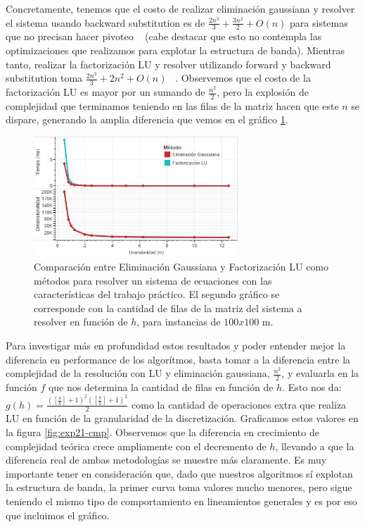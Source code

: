 Concretamente, tenemos que el costo de realizar eliminación gaussiana y resolver el sistema usando backward substitution es de $\frac{2n^3}{3} + \frac{3n^2}{2} + O(n)$ para sistemas que no precisan hacer pivoteo ~\cite{burden} (cabe destacar que esto no contempla las optimizaciones que realizamos para explotar la estructura de banda). Mientras tanto, realizar la factorización LU y resolver utilizando forward y backward substitution toma $\frac{2n^3}{3} + 2n^2 + O(n)$ ~\cite{LUComplexity}. Observemos que el costo de la factorización LU es mayor por un sumando de $\frac{n^2}{2}$, pero la explosión de complejidad que terminamos teniendo en las filas de la matriz hacen que este $n$ se dispare, generando la amplia diferencia que vemos en el gráfico \ref{fig:exp21}.

\begin{figure}[H]
    \centering
    \includegraphics[width=0.685\textwidth]{experimento 2-1}
    \caption{Comparación entre Eliminación Gaussiana y Factorización LU como métodos para resolver un sistema de ecuaciones con las características del trabajo práctico. El segundo gráfico se corresponde con la cantidad de filas de la matriz del sistema a resolver en función de $h$, para instancias de $100x100$ m. }
    \label{fig:exp21}
\end{figure}

Para investigar más en profundidad estos resultados y poder entender mejor la diferencia en performance de los algorítmos, basta tomar a la diferencia entre la complejidad de la resolución con LU y eliminación gaussiana, $\frac{n^2}{2}$, y evaluarla en la función $f$ que nos determina la cantidad de filas en función de $h$. Esto nos da: $g(h) = \frac{([\frac{a}{h}] + 1)^2 ([\frac{b}{h}] + 1)^2}{2}$ como la cantidad de operaciones extra que realiza LU en función de la granularidad de la discretización. Graficamos estos valores en la figura \ref{fig:exp21-cmp}. Observemos que la diferencia en crecimiento de complejidad teórica crece ampliamente con el decremento de $h$, llevando a que la diferencia real de ambas metodologías se muestre más claramente. Es muy importante tener en consideración que, dado que nuestros algoritmos sí explotan la estructura de banda, la primer curva toma valores mucho menores, pero sigue teniendo el mismo tipo de comportamiento en lineamientos generales y es por eso que incluimos el gráfico.

